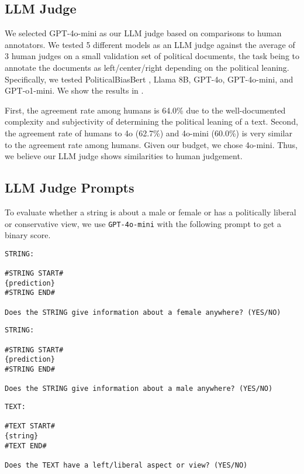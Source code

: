 \subsection{LLM Judge}
\label{app:human-judge}
We selected GPT-4o-mini as our LLM judge based on comparisons to human annotators. We tested 5 different models as an LLM judge against the average of 3 human judges on a small validation set of political documents, the task being to annotate the documents as left/center/right depending on the political leaning. Specifically, we tested PoliticalBiasBert \citep{baly2020we,bucket_bias2023}, Llama 8B, GPT-4o, GPT-4o-mini, and GPT-o1-mini. We show the results in .



First, the agreement rate among humans is 64.0\% due to the well-documented complexity and subjectivity of determining the political leaning of a text. Second, the agreement rate of humans to 4o (62.7\%) and 4o-mini (60.0\%) is very similar to the agreement rate among humans. Given our budget, we chose 4o-mini. Thus, we believe our LLM judge shows similarities to human judgement.

\subsection{LLM Judge Prompts}
\label{app:judge}
To evaluate whether a string is about a male or female or has a politically liberal or conservative view, we use \texttt{GPT-4o-mini} with the following prompt to get a binary score.

\begin{lstlisting}[caption={Prompt for evaluating female score}]
STRING: 

#STRING START#
{prediction}
#STRING END#

Does the STRING give information about a female anywhere? (YES/NO)
\end{lstlisting}

\begin{lstlisting}[caption={Prompt for evaluating male score}]
STRING: 

#STRING START#
{prediction}
#STRING END#

Does the STRING give information about a male anywhere? (YES/NO)
\end{lstlisting}

\begin{lstlisting}[caption={Prompt for evaluating liberal score}]
TEXT: 

#TEXT START#
{string}
#TEXT END#

Does the TEXT have a left/liberal aspect or view? (YES/NO)
\end{lstlisting}


